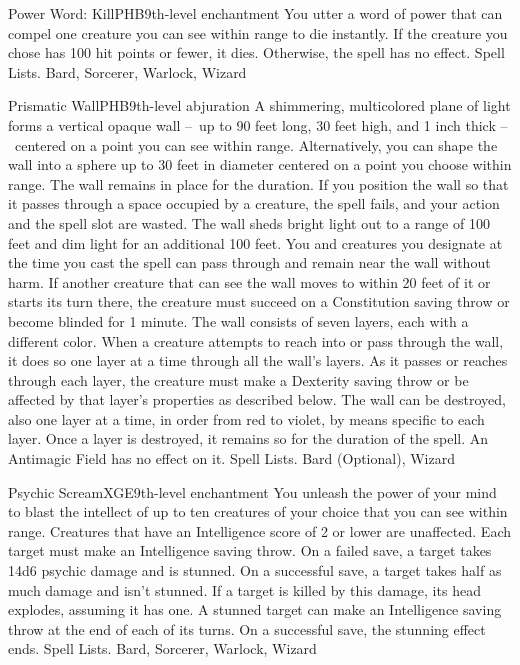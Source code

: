 \begin{spell}{Power Word: Kill}{PHB}{9th-level enchantment}
{
}
You utter a word of power that can compel one creature you can see within range to die instantly. If the creature you chose has 100 hit points or fewer, it dies. Otherwise, the spell has no effect.
Spell Lists. Bard, Sorcerer, Warlock, Wizard
\end{spell}

\begin{spell}{Prismatic Wall}{PHB}{9th-level abjuration}
{
}
A shimmering, multicolored plane of light forms a vertical opaque wall – up to 90 feet long, 30 feet high, and 1 inch thick – centered on a point you can see within range. Alternatively, you can shape the wall into a sphere up to 30 feet in diameter centered on a point you choose within range. The wall remains in place for the duration. If you position the wall so that it passes through a space occupied by a creature, the spell fails, and your action and the spell slot are wasted.
The wall sheds bright light out to a range of 100 feet and dim light for an additional 100 feet. You and creatures you designate at the time you cast the spell can pass through and remain near the wall without harm. If another creature that can see the wall moves to within 20 feet of it or starts its turn there, the creature must succeed on a Constitution saving throw or become blinded for 1 minute.
The wall consists of seven layers, each with a different color. When a creature attempts to reach into or pass through the wall, it does so one layer at a time through all the wall’s layers. As it passes or reaches through each layer, the creature must make a Dexterity saving throw or be affected by that layer’s properties as described below.
The wall can be destroyed, also one layer at a time, in order from red to violet, by means specific to each layer. Once a layer is destroyed, it remains so for the duration of the spell. An Antimagic Field has no effect on it.
Spell Lists. Bard (Optional), Wizard
\end{spell}

\begin{spell}{Psychic Scream}{XGE}{9th-level enchantment}
{
}
You unleash the power of your mind to blast the intellect of up to ten creatures of your choice that you can see within range. Creatures that have an Intelligence score of 2 or lower are unaffected.
Each target must make an Intelligence saving throw. On a failed save, a target takes 14d6 psychic damage and is stunned. On a successful save, a target takes half as much damage and isn’t stunned. If a target is killed by this damage, its head explodes, assuming it has one.
A stunned target can make an Intelligence saving throw at the end of each of its turns. On a successful save, the stunning effect ends.
Spell Lists. Bard, Sorcerer, Warlock, Wizard
\end{spell}

